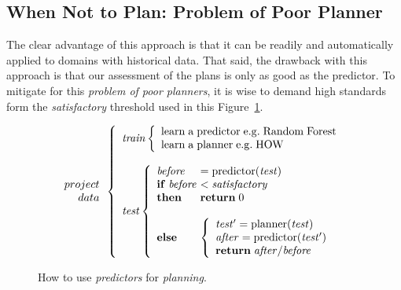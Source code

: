 \documentclass[conference]{IEEEtran}
\newcommand{\fig}[1]{Figure~\ref{fig:#1}}
\begin{document}
\subsection{When Not to Plan: Problem of Poor Planner}

The clear advantage of this approach is that it can be readily and automatically
applied to domains with historical data. That said, the drawback with this approach
is that our assessment of the plans is only as good as the predictor. To 
mitigate for this {\em problem of poor planners}, it is wise to demand high standards form the {\em
satisfactory} threshold used in this \fig{work}. 



\begin{figure}[!t]
\small
\[  
\begin{array}{r}
project\\
data
\end{array} 
\left\{\begin{array}{l}\mathit{train}
        \left\{\begin{array}{l}
                \mathrm{learn\;a\;}\mathrm{predictor\;}\mathrm{e.g.\;Random\;Forest}\\
                \mathrm{learn\;a\;}\mathrm{planner\;}\mathrm{e.g.\; HOW}
              \end{array}\right.
       \\
      ~\\
\mathit{test}  
    \left\{\begin{array}{l@{~}l}
           \mathit{before}& =\mathrm{predictor}(\mathit{test})\\
           \mathrm{\bf if\;}\mathit{before} & <  \mathit{satisfactory}\\
           \mathrm{\bf then}  & \mathrm{{\bf return}\; 0}\\~\\
           \mathrm{\bf else} &
           \left\{
            \begin{array}{l}
                \mathit{test'} = \mathrm{planner}(\mathit{test})\\
                \mathit{after} =\mathrm{predictor}(\mathit{test'})\\ 
                \mathrm{{\bf return}\;} \mathit{after} /  \mathit{before}
            \end{array}
          \right.
   \end{array}\right.
\end{array} \right. 
\] 
 
\caption{How to use {\em predictors} for {\em planning}.}\label{fig:work}
\end{figure}
\end{document}
